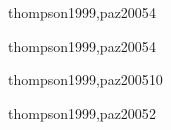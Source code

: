 \begin{syllabus}
\begin{unit}{\ALTHREEDef}{thompson1999,paz2005}{4}
   \begin{learningoutcomes}
      \item \ALTHREEObjONE
      \item \ALTHREEObjTWO
      \item \ALTHREEObjFOUR
   \end{learningoutcomes}
\end{unit}

\begin{unit}{\PLFIVEDef}{thompson1999,paz2005}{4}
   \begin{topics}
      \item \PLFIVETopicProcedimientos
      \item \PLFIVETopicParametros
      \item \PLFIVETopicModulos
   \end{topics}
   \begin{learningoutcomes}
      \item \PLFIVEObjONE
      \item \PLFIVEObjTHREE
   \end{learningoutcomes}
\end{unit}

\begin{unit}{\PFTHREEDef}{thompson1999,paz2005}{10}
   \begin{topics}
      \item \PFTHREETopicTipos
      \item \PFTHREETopicCadenas
      \item \PFTHREETopicRepresentacion
      \item \PFTHREETopicEstructuras
   \end{topics}
   \begin{learningoutcomes}
      \item \PFTHREEObjONE
      \item \PFTHREEObjTHREE
      \item \PFTHREEObjFIVE
      \item \PFTHREEObjSEVEN
   \end{learningoutcomes}
\end{unit}

\begin{unit}{\DSFIVEDef}{thompson1999,paz2005}{2}
   \begin{topics}
      \item \DSFIVETopicGrafos
      \item \DSFIVETopicGrafosdirigidos
      \item \DSFIVETopicArbolesde
   \end{topics}
   \begin{learningoutcomes}
      \item \DSFIVEObjONE
   \end{learningoutcomes}
\end{unit}


\end{syllabus}
